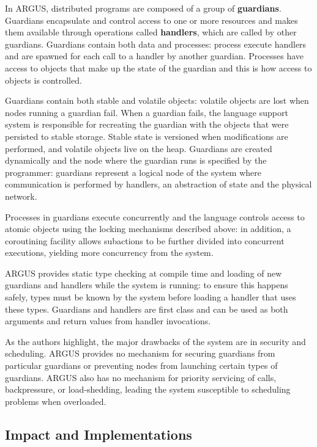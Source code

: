 In ARGUS, distributed programs are composed of a group of \textbf{guardians}.  Guardians encapsulate and control access to one or more resources and makes them available through operations called \textbf{handlers}, which are called by other guardians.  Guardians contain both data and processes: process execute handlers and are spawned for each call to a handler by another guardian. Processes have access to objects that make up the state of the guardian and this is how access to objects is controlled.

Guardians contain both stable and volatile objects: volatile objects are lost when nodes running a guardian fail.  When a guardian fails, the language support system is responsible for recreating the guardian with the objects that were persisted to stable storage.  Stable state is versioned when modifications are performed, and volatile objects live on the heap.  Guardians are created dynamically and the node where the guardian runs is specified by the programmer: guardians represent a logical node of the system where communication is performed by handlers, an abstraction of state and the physical network.

Processes in guardians execute concurrently and the language controls access to atomic objects using the locking mechanisms described above: in addition, a coroutining facility allows subactions to be further divided into concurrent executions, yielding more concurrency from the system.

ARGUS provides static type checking at compile time and loading of new guardians and handlers while the system is running: to ensure this happens safely, types must be known by the system before loading a handler that uses these types.  Guardians and handlers are first class and can be used as both arguments and return values from handler invocations.

As the authors highlight, the major drawbacks of the system are in security and scheduling.  ARGUS provides no mechanism for securing  guardians from particular guardians or preventing nodes from launching certain types of guardians.  ARGUS also has no mechanism for priority servicing of calls, backpressure, or load-shedding, leading the system susceptible to scheduling problems when overloaded.

\subsection{Impact and Implementations}